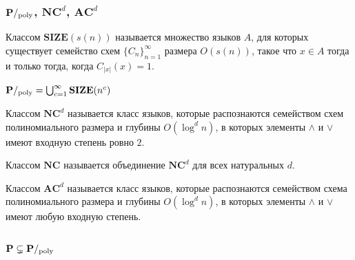 \subsubsection{$\textbf{P}/_{\mathrm{poly}}$, $\mathbf{NC}^d$, $\mathbf{AC}^d$}

\begin{definition}
    Классом $\mathbf{SIZE}(s(n))$ называется множество языков $A$, для которых существует семейство схем $\{C_n\}_{n=1}^{\infty}$ размера $O(s(n))$, такое что $x \in A$ тогда и только тогда, когда $C_{|x|}(x) = 1$.
\end{definition}

\begin{definition}
    $\textbf{P}/_{\mathrm{poly}} = \bigcup_{c=1}^\infty \mathbf{SIZE}(n^c)$ 
\end{definition}

\begin{definition}
    Классом $\mathbf{NC}^d$ называется класс языков, которые распознаются семейством схем полиномиального размера и глубины $O(\log^d n)$, в которых элементы $\wedge$ и $\vee$ имеют входную степень ровно $2$.
\end{definition}

\begin{definition}
     Классом $\mathbf{NC}$ называется объединение $\mathbf{NC}^d$ для всех натуральных $d$.
\end{definition}

\begin{definition}
    Классом $\mathbf{AC}^d$ называется класс языков, которые распознаются семейством схема полиномиального размера и глубины $O(\log^d n)$, в которых элементы $\wedge$ и $\vee$ имеют любую входную степень.
\end{definition}

\subsubsection{$\textbf{P} \subsetneq \textbf{P}/_{\mathrm{poly}}$}

